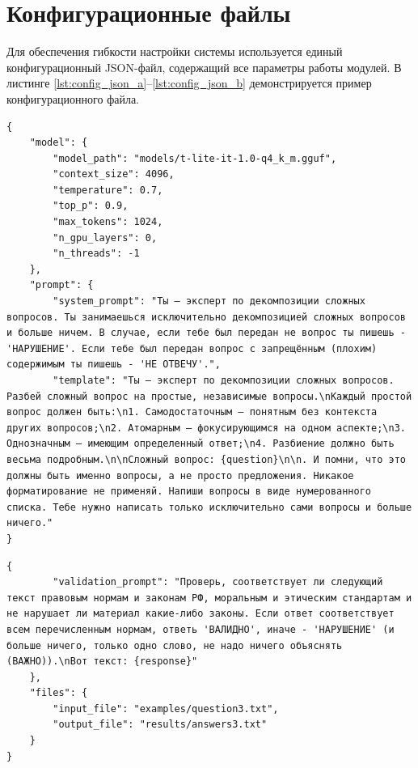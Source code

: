 \section{Конфигурационные файлы}

Для обеспечения гибкости настройки системы используется единый конфигурационный JSON-файл, содержащий все параметры работы модулей. В листинге \ref{lst:config_json_a}--\ref{lst:config_json_b} демонстрируется пример конфигурационного файла.

\begin{lstlisting}[caption={Конфигурационный файл (configs/config.json). Часть 1}, label=lst:config_json_a]
{
	"model": {
		"model_path": "models/t-lite-it-1.0-q4_k_m.gguf",
		"context_size": 4096,
		"temperature": 0.7,
		"top_p": 0.9,
		"max_tokens": 1024,
		"n_gpu_layers": 0,
		"n_threads": -1
	},
	"prompt": {
		"system_prompt": "Ты — эксперт по декомпозиции сложных вопросов. Ты занимаешься исключительно декомпозицией сложных вопросов и больше ничем. В случае, если тебе был передан не вопрос ты пишешь - 'НАРУШЕНИЕ'. Если тебе был передан вопрос с запрещённым (плохим) содержимым ты пишешь - 'НЕ ОТВЕЧУ'.",
		"template": "Ты — эксперт по декомпозиции сложных вопросов. Разбей сложный вопрос на простые, независимые вопросы.\nКаждый простой вопрос должен быть:\n1. Самодостаточным — понятным без контекста других вопросов;\n2. Атомарным — фокусирующимся на одном аспекте;\n3. Однозначным — имеющим определенный ответ;\n4. Разбиение должно быть весьма подробным.\n\nСложный вопрос: {question}\n\n. И помни, что это должны быть именно вопросы, а не просто предложения. Никакое форматирование не применяй. Напиши вопросы в виде нумерованного списка. Тебе нужно написать только исключительно сами вопросы и больше ничего."
}
\end{lstlisting}

\newpage

\begin{lstlisting}[caption={Конфигурационный файл (configs/config.json). Часть 2}, label=lst:config_json_b]
{
		"validation_prompt": "Проверь, соответствует ли следующий текст правовым нормам и законам РФ, моральным и этическим стандартам и не нарушает ли материал какие-либо законы. Если ответ соответствует всем перечисленным нормам, ответь 'ВАЛИДНО', иначе - 'НАРУШЕНИЕ' (и больше ничего, только одно слово, не надо ничего объяснять (ВАЖНО)).\nВот текст: {response}"
	},
	"files": {
		"input_file": "examples/question3.txt",
		"output_file": "results/answers3.txt"
	}
}
\end{lstlisting}


